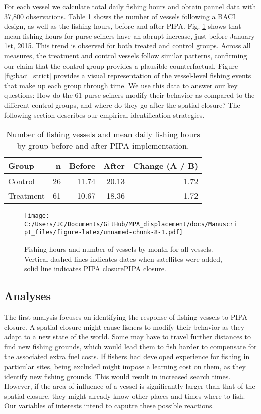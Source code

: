 \documentclass[11pt,]{article}
\begin{document}
For each vessel we calculate total daily fishing hours and obtain pannel
data with 37,800 observations. Table \ref{tab:baci_n_s} shows the number
of vessels following a BACI design, as well as the fishing hours, before
and after PIPA. Fig. \ref{fig:all_vessels} shows that mean fishing hours
for purse seiners have an abrupt increase, just before January 1st,
2015. This trend is observed for both treated and control groups. Across
all measures, the treatment and control vessels follow similar patterns,
confirming our claim that the control group provides a plausible
counterfactual. Figure \ref{fig:baci_strict} provides a visual
representation of the vessel-level fishing events that make up each
group through time. We use this data to answer our key questions: How do
the 61 purse seiners modify their behavior as compared to the different
control groups, and where do they go after the spatial closure? The
following section describes our empirical identification strategies.

\begin{table}[H]

\caption{\label{tab:unnamed-chunk-7}\label{tab:baci_n_s}Number of fishing vessels and mean daily fishing hours by group before and after PIPA implementation.}
\centering
\begin{tabular}[t]{lrrrr}
\toprule
Group & n & Before & After & Change (A / B)\\
\midrule
Control & 26 & 11.74 & 20.13 & 1.72\\
Treatment & 61 & 10.67 & 18.36 & 1.72\\
\bottomrule
\end{tabular}
\end{table}

\begin{figure}
\centering
\texttt{[image: C:/Users/JC/Documents/GitHub/MPA\_displacement/docs/Manuscript\_files/figure-latex/unnamed-chunk-8-1.pdf]}
\caption{\label{fig:unnamed-chunk-8}\label{fig:all_vessels}Fishing hours and
number of vessels by month for all vessels. Vertical dashed lines
indicates dates when satellites were added, solid line indicates PIPA
closurePIPA closure.}
\end{figure}

\hypertarget{analyses}{%
\subsection{Analyses}\label{analyses}}

The first analysis focuses on identifying the response of fishing
vessels to PIPA closure. A spatial closure might cause fishers to modify
their behavior as they adapt to a new state of the world. Some may have
to travel further distances to find new fishing grounds, which would
lead them to fish harder to compensate for the associated extra fuel
costs. If fishers had developed experience for fishing in particular
sites, being excluded might impose a learning cost on them, as they
identify new fishing grounds. This would result in increased search
times. However, if the area of influence of a vessel is significantly
larger than that of the spatial closure, they might already know other
places and times where to fish. Our variables of interests intend to
caputre these possible reactions.
\end{document}
